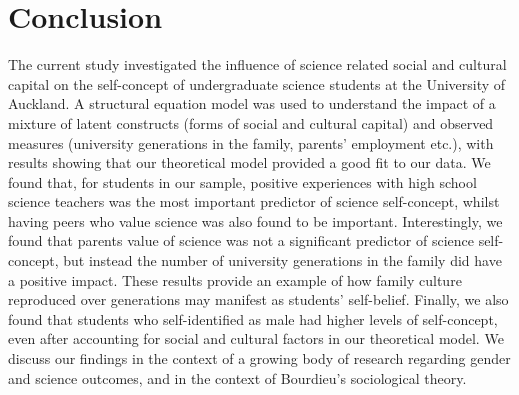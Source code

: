 \section*{Conclusion}
The current study investigated the influence of science related social and cultural capital on the self-concept of undergraduate science students at the University of Auckland. A structural equation model was used to understand the impact of a mixture of latent constructs (forms of social and cultural capital) and observed measures (university generations in the family, parents' employment etc.), with results showing that our theoretical model provided a good fit to our data. We found that, for students in our sample, positive experiences with high school science teachers was the most important predictor of science self-concept, whilst having peers who value science was also found to be important. Interestingly, we found that parents value of science was not a significant predictor of science self-concept, but instead the number of university generations in the family did have a positive impact. These results provide an example of how family culture reproduced over generations may manifest as students' self-belief. Finally, we also found that students who self-identified as male had higher levels of self-concept, even after accounting for social and cultural factors in our theoretical model. We discuss our findings in the context of a growing body of research regarding gender and science outcomes, and in the context of Bourdieu's sociological theory.  


%
%







